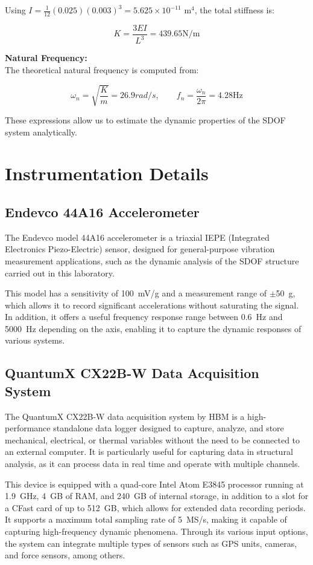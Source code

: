 \documentclass{article}  %
\begin{document}
Using $I = \frac{1}{12}(0.025)(0.003)^3 = 5.625 \times 10^{-11}$ m$^4$, the total stiffness is:

\[
K = \frac{3EI}{L^3} = 439.65 \text{N/m}
\]

\textbf{Natural Frequency:} \\
The theoretical natural frequency is computed from:

\[
\omega_n = \sqrt{\frac{K}{m}}= 26.9 rad/s, \qquad f_n = \frac{\omega_n}{2\pi} = 4.28 \text{Hz}
\]

These expressions allow us to estimate the dynamic properties of the SDOF system analytically.
\newpage
\section{Instrumentation Details} 

\subsection{Endevco 44A16 Accelerometer}

The Endevco model 44A16 accelerometer is a triaxial IEPE (Integrated Electronics Piezo-Electric) sensor, designed for general-purpose vibration measurement applications, such as the dynamic analysis of the SDOF structure carried out in this laboratory. 

This model has a sensitivity of 100~mV/g and a measurement range of $\pm$50~g, which allows it to record significant accelerations without saturating the signal. In addition, it offers a useful frequency response range between 0.6~Hz and 5000~Hz depending on the axis, enabling it to capture the dynamic responses of various systems.


\subsection{QuantumX CX22B-W Data Acquisition System}

The QuantumX CX22B-W data acquisition system by HBM is a high-performance standalone data logger designed to capture, analyze, and store mechanical, electrical, or thermal variables without the need to be connected to an external computer. It is particularly useful for capturing data in structural analysis, as it can process data in real time and operate with multiple channels.

This device is equipped with a quad-core Intel Atom E3845 processor running at 1.9~GHz, 4~GB of RAM, and 240~GB of internal storage, in addition to a slot for a CFast card of up to 512~GB, which allows for extended data recording periods. It supports a maximum total sampling rate of 5~MS/s, making it capable of capturing high-frequency dynamic phenomena. Through its various input options, the system can integrate multiple types of sensors such as GPS units, cameras, and force sensors, among others.
\end{document}
